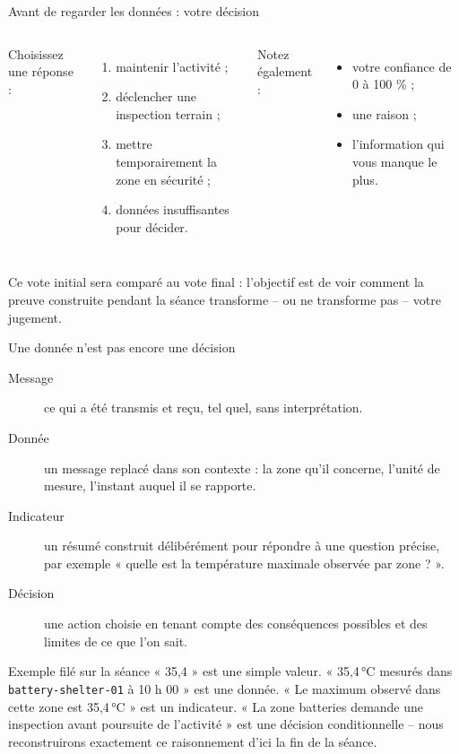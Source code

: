 \documentclass[aspectratio=169]{beamer}
\begin{document}
\begin{frame}{Avant de regarder les données : votre décision}
  \begin{columns}[T]
    Choisissez une réponse :
    \begin{enumerate}
      \item[A.] maintenir l'activité ;
      \item[B.] déclencher une inspection terrain ;
      \item[C.] mettre temporairement la zone en sécurité ;
      \item[D.] données insuffisantes pour décider.
    \end{enumerate}
    Notez également :
    \begin{itemize}
      \item votre confiance de 0 à 100 \% ;
      \item une raison ;
      \item l'information qui vous manque le plus.
    \end{itemize}
  \end{columns}
  \vfill
  \alert{Ce vote initial sera comparé au vote final : l'objectif est de voir comment la preuve construite pendant la séance transforme -- ou ne transforme pas -- votre jugement.}
\end{frame}

\begin{frame}{Une donnée n'est pas encore une décision}
  \begin{description}
    \item[Message] ce qui a été transmis et reçu, tel quel, sans interprétation.
    \item[Donnée] un message replacé dans son contexte : la zone qu'il concerne, l'unité de mesure, l'instant auquel il se rapporte.
    \item[Indicateur] un résumé construit délibérément pour répondre à une question précise, par exemple « quelle est la température maximale observée par zone ? ».
    \item[Décision] une action choisie en tenant compte des conséquences possibles et des limites de ce que l'on sait.
  \end{description}
  \begin{block}{Exemple filé sur la séance}
    « 35,4 » est une simple valeur. « 35,4\,°C mesurés dans \texttt{battery-shelter-01} à 10 h 00 » est une donnée. « Le maximum observé dans cette zone est 35,4\,°C » est un indicateur. « La zone batteries demande une inspection avant poursuite de l'activité » est une décision conditionnelle -- nous reconstruirons exactement ce raisonnement d'ici la fin de la séance.
  \end{block}
\end{frame}
\end{document}
